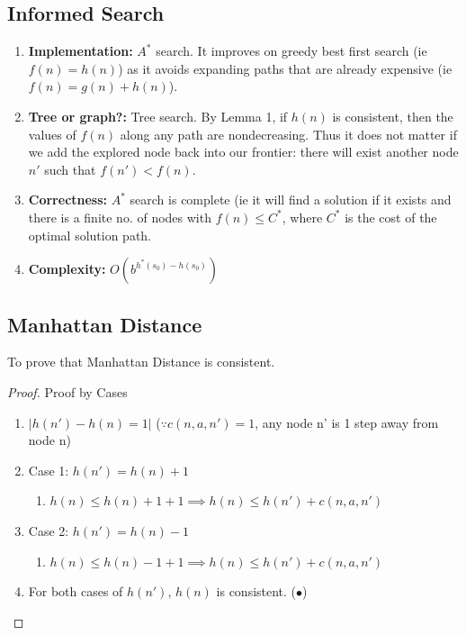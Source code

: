 \documentclass[runningheads]{llncs}
\begin{document}
\subsection{Informed Search}
\begin{enumerate}
    \item \textbf{Implementation:} \( A^* \) search. It improves on greedy best first search (ie \( f(n) = h(n) \)) as it avoids expanding paths that are already expensive (ie \( f(n) = g(n) + h(n) \)).
    \item \textbf{Tree or graph?:} Tree search. By Lemma 1, if \( h(n) \) is consistent, then the values of \( f(n) \) along any path are nondecreasing. Thus it does not matter if we add the explored node back into our frontier: there will exist another node \( n' \) such that \( f(n') < f(n) \).
    \item \textbf{Correctness:} \( A^* \) search is complete (ie it will find a solution if it exists and there is a finite no. of nodes with \( f(n) \leq C^{*} \), where \( C^* \) is the cost of the optimal solution path.
    \item \textbf{Complexity:} \( O(b^{h^*(s_0) - h(s_0)}) \) 
\end{enumerate}

\subsection{Manhattan Distance} 
To prove that Manhattan Distance is consistent.
\begin{proof} Proof by Cases
    \begin{enumerate}
        \item \( |h(n') - h(n) = 1| \) (\( \because c(n, a, n') = 1 \), any node n' is 1 step away from node n)
        \item Case 1: \( h(n') = h(n) + 1 \)
        \begin{enumerate}
            \item \( h(n) \leq h(n) + 1 + 1 \implies h(n) \leq h(n') + c(n, a, n') \)
        \end{enumerate}
        \item Case 2: \( h(n') = h(n) - 1 \)
        \begin{enumerate}
            \item \( h(n) \leq h(n) - 1 + 1 \implies h(n) \leq h(n') + c(n, a, n') \)
        \end{enumerate}
        \item For both cases of \( h(n') \), \( h(n) \) is consistent. (\(\bullet\))
    \end{enumerate}
\end{proof}
\end{document}

